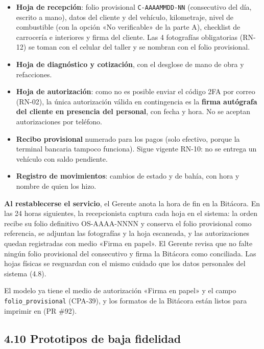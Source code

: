 \begin{itemize}
\tightlist
\item \textbf{Hoja de recepción}: folio provisional \texttt{C-AAAAMMDD-NN}
(consecutivo del día, escrito a mano), datos del cliente y del vehículo,
kilometraje, nivel de combustible (con la opción «No verificable» de la
parte A), checklist de carrocería e interiores y firma del cliente. Las 4
fotografías obligatorias (RN-12) se toman con el celular del taller y se
nombran con el folio provisional.
\item \textbf{Hoja de diagnóstico y cotización}, con el desglose de mano de
obra y refacciones.
\item \textbf{Hoja de autorización}: como no es posible enviar el código
2FA por correo (RN-02), la única autorización válida en contingencia es la
\textbf{firma autógrafa del cliente en presencia del personal}, con fecha y
hora. No se aceptan autorizaciones por teléfono.
\item \textbf{Recibo provisional} numerado para los pagos (solo efectivo,
porque la terminal bancaria tampoco funciona). Sigue vigente RN-10: no se
entrega un vehículo con saldo pendiente.
\item \textbf{Registro de movimientos}: cambios de estado y de bahía, con
hora y nombre de quien los hizo.
\end{itemize}

\textbf{Al restablecerse el servicio}, el Gerente anota la hora de fin en
la Bitácora. En las 24 horas siguientes, la recepcionista captura cada hoja
en el sistema: la orden recibe su folio definitivo OS-AAAA-NNNN y conserva
el folio provisional como referencia, se adjuntan las fotografías y la hoja
escaneada, y las autorizaciones quedan registradas con medio «Firma en
papel». El Gerente revisa que no falte ningún folio provisional del
consecutivo y firma la Bitácora como conciliada. Las hojas físicas se
resguardan con el mismo cuidado que los datos personales del sistema (4.8).

El modelo ya tiene el medio de autorización «Firma en papel» y el campo
\texttt{folio\_provisional} (CPA-39), y los formatos de la Bitácora están listos para
imprimir en  (PR \#92). 

\subsection{4.10 Prototipos de baja fidelidad}\label{prototipos-de-baja-fidelidad}

